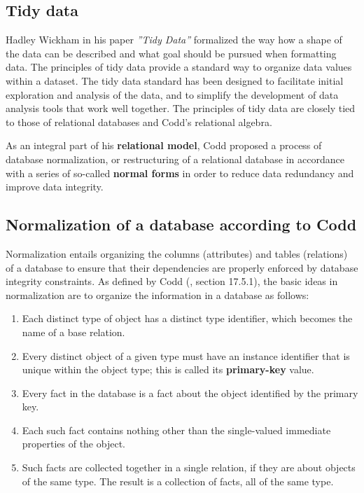 \documentclass[11pt]{article}
\begin{document}
    \subsection{Tidy data} \label{subsec:tidy_data}

    Hadley Wickham in his paper \textit{''Tidy Data''}\cite{Wickham2014} formalized the way how a shape of the data can be described and what goal should be pursued when formatting data.
    The principles of tidy data provide a standard way to organize data values within a dataset.
    The tidy data standard has been designed to facilitate initial exploration and analysis of the data, and to simplify the development of data analysis tools that work well together.
    The principles of tidy data are closely tied to those of relational databases and Codd's relational algebra\cite{Codd1990}.

    As an integral part of his \textbf{relational model}, Codd proposed a process of database normalization, or restructuring of a relational database in accordance with a series of so-called \textbf{normal forms} in order to reduce data redundancy and improve data integrity.

    \subsection{Normalization of a database according to Codd} \label{subsec:db_norm}

    Normalization entails organizing the columns (attributes) and tables (relations) of a database to ensure that their dependencies are properly enforced by database integrity constraints.
    As defined by Codd (\cite{Codd1990}, section 17.5.1), the basic ideas in normalization are to organize the information in a database as follows:

    \begin{enumerate}
        \item Each distinct type of object has a distinct type identifier, which becomes the name of a base relation.
        \item Every distinct object of a given type must have an instance identifier that is unique within the object type;
        this is called its \textbf{primary-key} value.
        \item Every fact in the database is a fact about the object identified by the primary key.
        \item Each such fact contains nothing other than the single-valued immediate properties of the object.
        \item Such facts are collected together in a single relation, if they are about objects of the same type.
        The result is a collection of facts, all of the same type.
    \end{enumerate}
\end{document}
